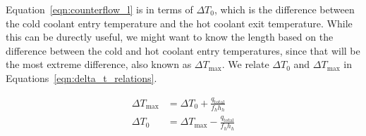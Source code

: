 \documentclass{article}
\numberwithin{equation}{subsection}
\theoremstyle{remark}
\newcommand{\qtotal}{q_{\mathrm{total}}}
\newcommand{\DeltaT}{\Delta{}T}
\newcommand{\DeltaTmax}{\DeltaT_{\mathrm{max}}}
\begin{document}
Equation~\ref{eqn:counterflow_l} is in terms of \(\DeltaT_{0}\), which is the difference between the cold coolant entry temperature and the hot coolant exit temperature.
While this can be durectly useful, we might want to know the length based on the difference between the cold and hot coolant entry temperatures, since that will be the most extreme difference, also known as \(\DeltaTmax\).
We relate \(\DeltaT_{0}\) and \(\DeltaTmax\) in Equations~\ref{eqn:delta_t_relations}.

\begin{subequations}
\label{eqn:delta_t_relations}
\begin{align}
\DeltaTmax &= \DeltaT_{0} + \frac{\qtotal}{f_{h} h_{h}} \\
\DeltaT_{0} &= \DeltaTmax - \frac{\qtotal}{f_{h} h_{h}}
\end{align}
\end{subequations}
\end{document}
